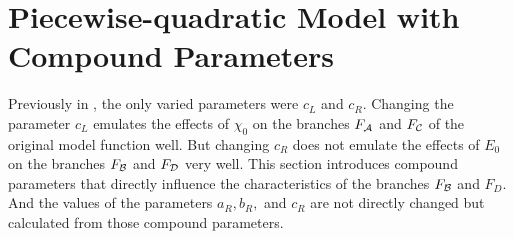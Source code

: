 \section{Piecewise-quadratic Model with Compound Parameters}
\label{sec:setup.quad.hyper}

Previously in , the only varied parameters were $c_L$ and $c_R$.
Changing the parameter $c_L$ emulates the effects of $\chi_0$ on the branches $F_{\mathcal{A}}$ and $F_{\mathcal{C}}$ of the original model function well.
But changing $c_R$ does not emulate the effects of $E_0$ on the branches $F_{\mathcal{B}}$ and $F_{\mathcal{D}}$ very well.
This section introduces compound parameters that directly influence the characteristics of the branches $F_{\mathcal{B}}$ and $F_D$.
And the values of the parameters $a_R, b_R,$ and $c_R$ are not directly changed but calculated from those compound parameters.




